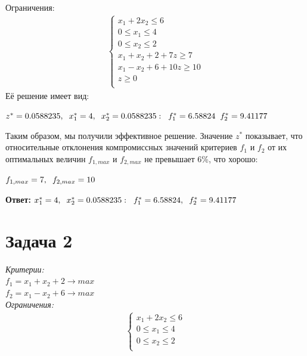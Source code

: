 \documentclass[14pt,fleqn]{extarticle}
\begin{document}
	Ограничения:
	\begin{align*}
		\begin{cases}
			x_1 + 2x_2 \leq 6\\
			0 \leq x_1 \leq 4\\
			0 \leq x_2 \leq 2\\
			x_1 + x_2 + 2 + 7z \geq 7\\
			x_1 - x_2 + 6 + 10z \geq 10\\
			z \geq 0\\
		\end{cases}
	\end{align*}
	\newpage
	Её решение имеет вид:
	\begin{center}
		$z^* = 0.0588235, \hspace{0.2cm} x_1^* = 4, \hspace{0.2cm} x_2^* = 0.0588235: \hspace{0.2cm} f_1^* = 6.58824 \hspace{0.2cm} f_2^* = 9.41177$
	\end{center}
	Таким образом, мы получили эффективное решение. Значение $z^*$ показывает, что относительные отклонения компромиссных значений критериев $f_1$ и $f_2$ от их оптимальных величин $f_{1, max}$ и $f_{2, max}$ не превышает 6\%, что хорошо:
	\begin{center}
		$f_{1, max} = 7, \hspace{0.2cm} f_{2, max} = 10$
	\end{center}
	\textbf{Ответ:} $x_1^* = 4, \hspace{0.2cm} x_2^* = 0.0588235: \hspace{0.2cm} f_1^* = 6.58824, \hspace{0.2cm} f_2^* = 9.41177$
	
	\section*{Задача 2}
	\textit{Критерии:}\\
	$f_1 = x_1 + x_2 + 2 \longrightarrow max$\\
	$f_2 = x_1 - x_2 + 6 \longrightarrow max$\\
	
	\textit{Ограничения:}
	\begin{align*}
		\begin{cases}
			x_1 + 2x_2 \leq 6\\
			0 \leq x_1 \leq 4\\
			0 \leq x_2 \leq 2\\
		\end{cases}
	\end{align*}
	
\end{document}

